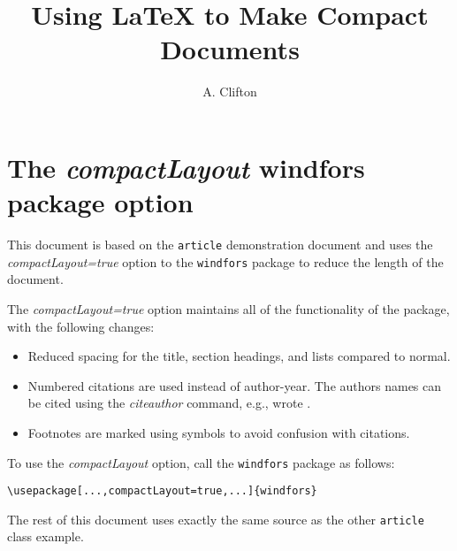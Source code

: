 \documentclass[twocolumn,a4paper]{article}
\title{Using LaTeX to Make Compact Documents}
\author{A. Clifton}
\begin{document}
\lstset{language=[LaTeX]Tex,columns=fullflexible,keepspaces=true,breaklines=true}

\section*{The \emph{compactLayout} windfors package option}

This document is based on the \texttt{article} demonstration document and uses the \emph{compactLayout=true} option to the \texttt{windfors} package to reduce the length of the document.

The \emph{compactLayout=true} option maintains all of the functionality of the package, with the following changes:
\begin{itemize}
\item Reduced spacing for the title, section headings, and lists compared to normal.
\item Numbered citations are used \citep[e.g.,][]{TechReportTest} instead of author-year. The authors names can be cited using the \emph{citeauthor} command, e.g., \citeauthor{TechReportTest} wrote \cite{TechReportTest}.
\item Footnotes are marked using symbols to avoid confusion with citations.  
\end{itemize}

To use the \emph{compactLayout} option, call the \texttt{windfors} package as follows:

\begin{lstlisting}
\usepackage[...,compactLayout=true,...]{windfors}
\end{lstlisting}

The rest of this document uses exactly the same source as the other \texttt{article} class example.

\clearpage

\maketitle



\tableofcontents
\listoffigures
\listoftables






\label{sec:TheBibliography}
\printbibliography

\appendix


\end{document}

